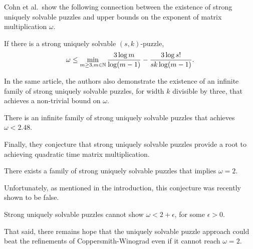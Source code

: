 \documentclass[11pt]{article}
\begin{document}
Cohn et al.~show the following connection between the existence of
strong uniquely solvable puzzles and upper bounds on the exponent of
matrix multiplication $\omega$.
\begin{lemma}
  \label{lem:omega}
  If there is a strong uniquely solvable $(s,k)$-puzzle,
  $$\omega \le \min_{m \ge 3, m \in \mathbb{N}} \frac{3 \log
    m}{\log(m-1)} - \frac{3 \log s!}{sk \log(m-1)}.$$
\end{lemma}
\noindent In the same article, the authors also demonstrate the
existence of an infinite family of strong uniquely solvable puzzles,
for width $k$ divisible by three, that achieves a non-trivial bound on
$\omega$.
\begin{lemma}
  There is an infinite family of strong uniquely solvable puzzles that
  achieves $\omega < 2.48$.
\end{lemma}
\noindent Finally, they conjecture that strong uniquely solvable
puzzles provide a root to achieving quadratic time matrix
multiplication.
\begin{conjecture}
  There exists a family of strong uniquely solvable puzzles that
  implies $\omega = 2$.
\end{conjecture}
\noindent Unfortunately, as mentioned in the introduction, this
conjecture was recently shown to be false.
\begin{lemma}
  Strong uniquely solvable puzzles cannot show $\omega < 2 +
  \epsilon$, for some $\epsilon > 0$.
\end{lemma}
\noindent That said, there remains hope that the uniquely solvable
puzzle approach could beat the refinements of Coppersmith-Winograd
even if it cannot reach $\omega = 2$.

\end{document}
